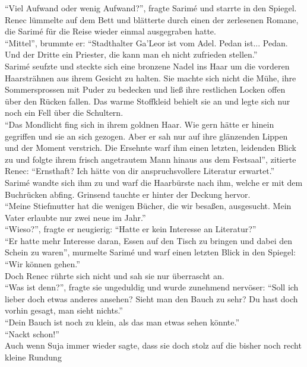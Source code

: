 ``Viel Aufwand oder wenig Aufwand?'', fragte Sarimé und starrte in den Spiegel.\\
Renec lümmelte auf dem Bett und blätterte durch einen der zerlesenen Romane, die Sarimé für die 
Reise wieder einmal ausgegraben hatte.\\
``Mittel'', brummte er: ``Stadthalter Ga'Leor ist vom Adel. Pedan ist... Pedan. Und der Dritte ein 
Priester, die kann man eh nicht zufrieden stellen.''\\
Sarimé seufzte und steckte sich eine bronzene Nadel ins Haar um die vorderen Haarsträhnen aus ihrem 
Gesicht zu halten. Sie machte sich nicht die Mühe, ihre Sommersprossen mit Puder zu bedecken und 
ließ ihre restlichen Locken offen über den Rücken fallen. Das warme Stoffkleid behielt sie an und 
legte sich nur noch ein Fell über die Schultern.\\
``Das Mondlicht fing sich in ihrem goldnen Haar. Wie gern hätte er hinein gegriffen und sie an sich 
gezogen. Aber er sah nur auf ihre glänzenden Lippen und der Moment verstrich. Die Ersehnte warf ihm 
einen letzten, leidenden Blick zu und folgte ihrem frisch angetrautem Mann hinaus aus dem 
Festsaal'', zitierte Renec: ``Ernsthaft? Ich hätte von dir anspruchsvollere Literatur erwartet.''\\
Sarimé wandte sich ihm zu und warf die Haarbürste nach ihm, welche er mit dem Buchrücken abfing. 
Grinsend tauchte er hinter der Deckung hervor.\\
``Meine Stiefmutter hat die wenigen Bücher, die wir besaßen, ausgesucht. Mein Vater erlaubte nur 
zwei neue im Jahr.''\\
``Wieso?'', fragte er neugierig: ``Hatte er kein Interesse an Literatur?''\\
``Er hatte mehr Interesse daran, Essen auf den Tisch zu bringen und dabei den Schein zu waren'', 
murmelte Sarimé und warf einen letzten Blick in den Spiegel: ``Wir können gehen.''\\
Doch Renec rührte sich nicht und sah sie nur überrascht an.\\
``Was ist denn?'', fragte sie ungeduldig und wurde zunehmend nervöser: ``Soll ich lieber doch etwas 
anderes ansehen? Sieht man den Bauch zu sehr? Du hast doch vorhin gesagt, man sieht nichts.''\\
``Dein Bauch ist noch zu klein, als das man etwas sehen könnte.''\\
``Nackt schon!''\\
Auch wenn Suja immer wieder sagte, dass sie doch stolz auf die bisher noch recht kleine Rundung 
